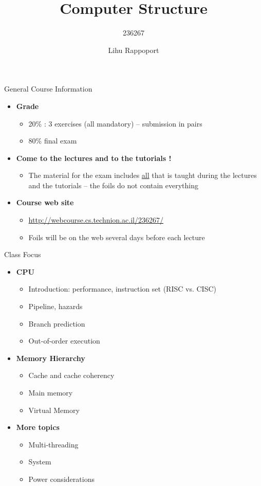\documentclass[aspectratio=169,12pt]{beamer}
\title{Computer Structure}
\subtitle{236267}
\author{Lihu Rappoport}
\date{}
\begin{document}
\frame{\titlepage}

\begin{frame}{General Course Information}
\begin{itemize}
    \item \textbf{Grade}
    \begin{itemize}
        \item 20\% : 3 exercises (all mandatory) -- submission in pairs
        \item 80\% final exam
    \end{itemize}
    \item \textbf{Come to the lectures and to the tutorials !}
    \begin{itemize}
        \item The material for the exam includes \underline{all} that is taught during the lectures and the tutorials -- the foils do not contain everything
    \end{itemize}
    \item \textbf{Course web site}
    \begin{itemize}
        \item \url{http://webcourse.cs.technion.ac.il/236267/}
        \item Foils will be on the web several days before each lecture
    \end{itemize}
\end{itemize}
\end{frame}

\begin{frame}{Class Focus}
\begin{itemize}
    \item \textbf{CPU}
    \begin{itemize}
        \item Introduction: performance, instruction set (RISC vs. CISC)
        \item Pipeline, hazards
        \item Branch prediction
        \item Out-of-order execution
    \end{itemize}
    \item \textbf{Memory Hierarchy}
    \begin{itemize}
        \item Cache and cache coherency
        \item Main memory
        \item Virtual Memory
    \end{itemize}
    \item \textbf{More topics}
    \begin{itemize}
        \item Multi-threading
        \item System
        \item Power considerations
    \end{itemize}
\end{itemize}
\end{frame}
\end{document}
